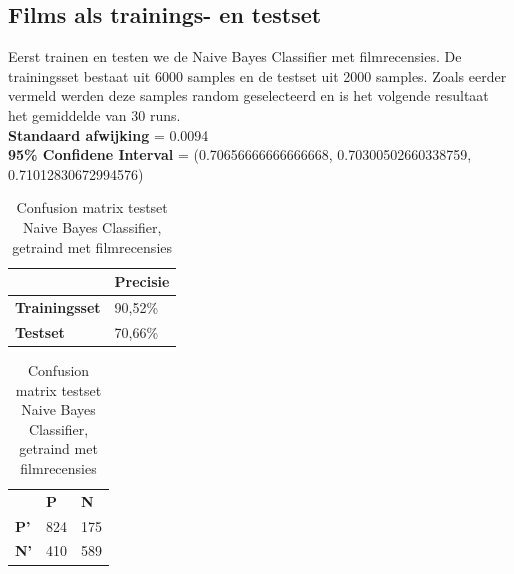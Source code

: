 \subsection{Films als trainings- en testset}\label{Films als trainings- en testset}

Eerst trainen en testen we de Naive Bayes Classifier met filmrecensies. De trainingsset bestaat uit 6000 samples en de testset uit 2000 samples. Zoals eerder vermeld werden deze samples random geselecteerd en is het volgende resultaat het gemiddelde van 30 runs.\\
\newline
\textbf{Standaard afwijking} = 0.0094\\
\textbf{95\% Confidene Interval} = (0.70656666666666668, 0.70300502660338759, 0.71012830672994576)\\
 
\begin{table}[h]
\centering
\setlength\tabcolsep{4pt}
\begin{minipage}{0.48\textwidth}
\centering
\begin{tabular}{l|l|}
\cline{2-2}
                                            & \textbf{Precisie} \\ \hline
\multicolumn{1}{|l|}{\textbf{Trainingsset}} & 90,52\%           \\ \hline
\multicolumn{1}{|l|}{\textbf{Testset}}      & 70,66\%           \\ \hline
\end{tabular}
\caption{Precisie Naive Bayes Classifier getraind op filmrecensies}
\label{tab:accuracy}
\end{minipage}%
\hfill
\begin{minipage}{0.48\textwidth}
\centering
\begin{tabular}{lll}
                                 & \textbf{P}               & \textbf{N}               \\ \cline{2-3} 
\multicolumn{1}{l|}{\textbf{P'}} & \multicolumn{1}{l|}{824} & \multicolumn{1}{l|}{175} \\ \cline{2-3} 
\multicolumn{1}{l|}{\textbf{N'}} & \multicolumn{1}{l|}{410} & \multicolumn{1}{l|}{589} \\ \cline{2-3} 
\end{tabular}
\caption{Confusion matrix testset Naive Bayes Classifier, getraind met filmrecensies} 
\label{tab:ompdiff} 
\end{minipage}
\end{table}




